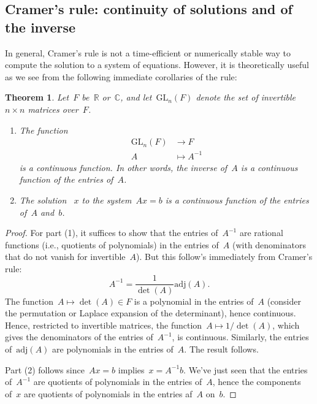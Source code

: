 \documentclass[11pt,twoside]{amsart}
\theoremstyle{plain}
\newtheorem*{thm*}{Theorem}
\theoremstyle{remark}
\theoremstyle{definition}
\theoremstyle{definition}
\newcommand{\R}{\mathbb{R}}
\newcommand{\C}{\mathbb{C}}
\begin{document}
\subsection*{Cramer's rule: continuity of solutions and of the inverse} 
In general, Cramer's rule is not a time-efficient or numerically stable way to
compute the solution to a system of equations.  However, it is theoretically
useful as we see from the following immediate corollaries of the rule:
\medskip

\begin{thm*}
Let~$F$ be~$\R$ or~$\C$, and let~$\mathrm{GL}_n(F)$ denote the
set of invertible~$n\times n$ matrices over~$F$.
\begin{enumerate}[(1)]
  \item The function
\begin{align*}
  \mathrm{GL}_n(F)&\longrightarrow F\\
  A&\longmapsto A^{-1}
\end{align*}
is a continuous function.  In other words, the inverse of~$A$ is a continuous
function of the entries of~$A$.
\item The solution ~$x$ to the system~$Ax=b$ is a continuous function of
  the entries of~$A$ and~$b$.
\end{enumerate}
\end{thm*}

\begin{proof}
For part (1), it suffices to show that the entries of~$A^{-1}$ are
rational functions (i.e., quotients of polynomials) in the entries of~$A$ (with
denominators that do not vanish for invertible~$A$).  But this follow's
immediately from Cramer's rule:
\[
  A^{-1}=\frac{1}{\det(A)}\mathrm{adj}(A).
\]
The function~$A\mapsto\det(A)\in F$ is a polynomial in the entries of~$A$
(consider the permutation or Laplace expansion of the determinant), hence
continuous.  Hence, restricted to invertible matrices, the function~$A\mapsto
1/\det(A)$, which gives the denominators of the entries of~$A^{-1}$, is
continuous.  Similarly, the entries of~$\mathrm{adj}(A)$ are polynomials in the
entries of~$A$.  The result follows.

Part (2) follows since~$Ax=b$ implies~$x=A^{-1}b$.  We've just seen
that the entries of~$A^{-1}$ are quotients of polynomials in the entries
of~$A$, hence the components of~$x$ are quotients of polynomials in the entries
af~$A$ on~$b$.
\end{proof}
\end{document}
